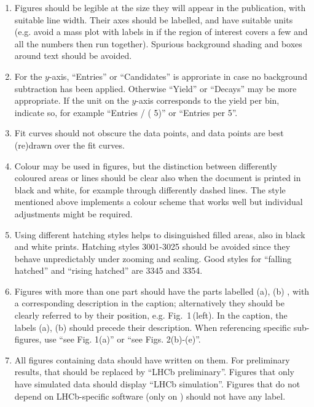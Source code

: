 \begin{enumerate}

\item Figures should be legible at the size they will appear in the
  publication, with suitable line width.  Their axes should be
  labelled, and have suitable units (e.g. avoid a mass plot with
  labels in \mevcc if the region of interest covers a few \gevcc
  and all the numbers then run together).  Spurious background shading
  and boxes around text should be avoided.

\item For the $y$-axis, ``Entries'' or ``Candidates'' is approriate in case no
background subtraction has been applied. Otherwise ``Yield'' or ``Decays''
may be more appropriate. If the unit on the $y$-axis corresponds to 
the yield per bin, indicate so, for example ``Entries / ( 5\mevcc )'' or ``Entries per 5\mevcc''.


\item Fit curves should not obscure the data points, and
   data points are best (re)drawn over the fit curves.

\item Colour may be used in figures, but the distinction between
  differently coloured areas or lines should be clear also when the
  document is printed in black and white, for example through
  differently dashed lines. The \lhcb style mentioned above implements
  a colour scheme that works well but individual adjustments might be
  required.

\item Using different hatching styles helps to disinguished filled areas, 
also in black and white prints. Hatching styles 3001-3025 should be
avoided since they behave unpredictably under zooming and scaling. 
Good styles for ``falling hatched'' and ``rising hatched'' are 3345 and 3354.


\item Figures with more than one part should have the parts labelled
  (a), (b) \etc, with a corresponding description in the caption;
  alternatively they should be clearly referred to by their position,
  e.g. Fig.~1\,(left). In the caption, the labels (a), (b) \etc should
  precede their description. When referencing specific sub-figures,
  use ``see Fig. 1(a)'' or ``see Figs. 2(b)-(e)''.

\item All figures containing \lhcb data should have \lhcb written on
  them. For preliminary
  results, that should be replaced by ``LHCb preliminary''.
  Figures that only have simulated data should display ``LHCb simulation''.
  Figures that do not depend on LHCb-specific software (\eg only on \pythia)
  should not have any label.


\end{enumerate}
